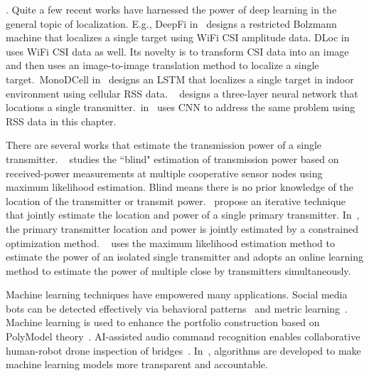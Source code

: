 . 
Quite a few recent works have harnessed the power of deep learning in the general topic of localization.
E.g., DeepFi in~\cite{DeepFi2016} designs a restricted Bolzmann machine that localizes a single target using WiFi CSI amplitude data. 
DLoc in~\cite{mobicom20-deeploc} uses WiFi CSI data as well. 
Its novelty is to transform CSI data into an image and then uses an image-to-image translation method to localize a single target.~MonoDCell 
in~\cite{sigspatial19-monodcell} designs an LSTM that localizes a single target in indoor environment using cellular RSS data.
~\cite{pimrc2021-localize} designs a three-layer neural network that locations a single transmitter.~\deeptx in~\cite{icccn20-deeptxfinder} 
uses CNN to address the same \mtl problem using RSS data in this chapter.

 There are several works that estimate the transmission power of a single transmitter.
~\cite{PowerEstimate2010Zafer} studies the ``blind" estimation of transmission power based on received-power measurements at 
multiple cooperative sensor nodes using maximum likelihood estimation. Blind means there is no prior knowledge of the location of the 
transmitter or transmit power.~\cite{Ureten2011powerlocation} propose an iterative technique that jointly estimate the location and 
power of a single primary transmitter.
In~\cite{icoin2007-powerposition}, the primary transmitter location and power is jointly estimated by a constrained optimization method.
~\cite{ipsn20-mtl} uses the maximum likelihood estimation method to estimate the power of an isolated single transmitter and 
adopts an online learning method to estimate the power of multiple close by transmitters simultaneously.

 Machine learning techniques have empowered many applications.
Social media bots can be detected effectively via behavioral patterns~\cite{wu2023botshape} and metric learning~\cite{wu2023bottrinet}.
Machine learning is used to enhance the portfolio construction based on PolyModel theory~\cite{siqiao2023}.
AI-assisted audio command recognition enables collaborative human-robot drone inspection of bridges~\cite{yuli_thesis}.
In~\cite{ziheng_thesis,ziheng2022}, algorithms are developed to make machine learning models more transparent and accountable.

  
